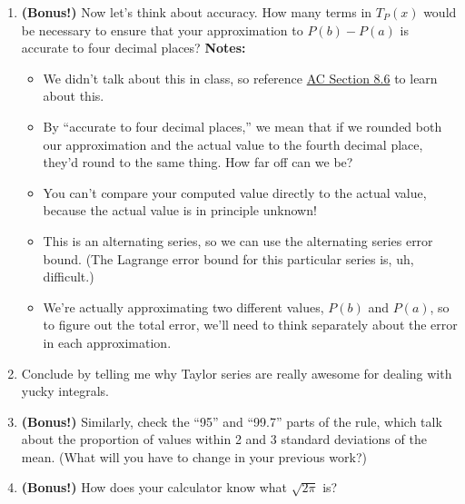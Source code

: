\begin{enumerate}[leftmargin=0pt]
    \vfill
    (Problem continues on other side of this page!)
    \newpage

    \item \textbf{(Bonus!)} Now let's think about accuracy. How many terms in $T_P(x)$ would be necessary to ensure that your approximation to $P(b)-P(a)$ is accurate to four decimal places? \textbf{Notes:}
    \begin{itemize}
        \item We didn't talk about this in class, so reference \href{https://activecalculus.org/single/sec-8-6-accuracy-of-approx.html}{AC Section 8.6} to learn about this.
        \item By ``accurate to four decimal places,'' we mean that if we rounded both our approximation and the actual value to the fourth decimal place, they'd round to the same thing. How far off can we be?
        \item You can't compare your computed value directly to the actual value, because the actual value is in principle unknown!
        \item This is an alternating series, so we can use the alternating series error bound. (The Lagrange error bound for this particular series is, uh, difficult.)
        \item We're actually approximating two different values, $P(b)$ and $P(a)$, so to figure out the total error, we'll need to think separately about the error in each approximation.
    \end{itemize} 
    \item Conclude by telling me why Taylor series are really awesome for dealing with yucky integrals.
    \item \textbf{(Bonus!)} Similarly, check the ``95'' and ``99.7'' parts of the rule, which talk about the proportion of values within 2 and 3 standard deviations of the mean.
    (What will you have to change in your previous work?)
    \item \textbf{(Bonus!)} How does your calculator know what $\sqrt{2\pi}$ is?
\end{enumerate}
